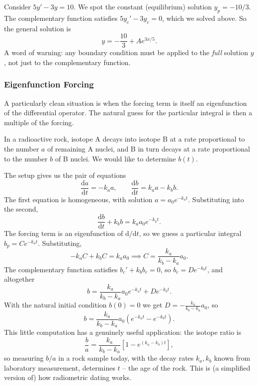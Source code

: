 \documentclass[a4paper]{scrartcl}
\begin{document}
\begin{example}
	Consider $5y' - 3y = 10$. We spot the constant (equilibrium) solution $y_p = -10/3$. The complementary function satisfies $5y_c' - 3y_c = 0$, which we solved above. So the general solution is
	$$
	y = -\frac{10}{3} + A e^{3x/5}.
	$$
	A word of warning: any boundary condition must be applied to the \emph{full} solution $y$, not just to the complementary function.
\end{example}

\subsubsection{Eigenfunction Forcing}

A particularly clean situation is when the forcing term is itself an eigenfunction of the differential operator. The natural guess for the particular integral is then a multiple of the forcing.

\begin{example}
	In a radioactive rock, isotope A decays into isotope B at a rate proportional to the number $a$ of remaining A nuclei, and B in turn decays at a rate proportional to the number $b$ of B nuclei. We would like to determine $b(t)$.

	The setup gives us the pair of equations
	$$
	\frac{\mathrm{d}a}{\mathrm{d}t} = -k_a a, \qquad \frac{\mathrm{d}b}{\mathrm{d}t} = k_a a - k_b b.
	$$
	The first equation is homogeneous, with solution $a = a_0 e^{-k_a t}$. Substituting into the second,
	$$
	\frac{\mathrm{d}b}{\mathrm{d}t} + k_b b = k_a a_0 e^{-k_a t}.
	$$
	The forcing term is an eigenfunction of $\mathrm{d}/\mathrm{d}t$, so we guess a particular integral $b_p = C e^{-k_a t}$. Substituting,
	$$
	-k_a C + k_b C = k_a a_0 \implies C = \frac{k_a}{k_b - k_a} a_0.
	$$
	The complementary function satisfies $b_c' + k_b b_c = 0$, so $b_c = D e^{-k_b t}$, and altogether
	$$
	b = \frac{k_a}{k_b - k_a} a_0 e^{-k_a t} + D e^{-k_b t}.
	$$
	With the natural initial condition $b(0) = 0$ we get $D = -\frac{k_a}{k_b - k_a}a_0$, so
	$$
	b = \frac{k_a}{k_b - k_a} a_0 \left(e^{-k_a t} - e^{-k_b t}\right).
	$$
	This little computation has a genuinely useful application: the isotope ratio is
	$$
	\frac{b}{a} = \frac{k_a}{k_b - k_a}\left[1 - e^{(k_a - k_b)t}\right],
	$$
	so measuring $b/a$ in a rock sample today, with the decay rates $k_a, k_b$ known from laboratory measurement, determines $t$ -- the age of the rock. This is (a simplified version of) how radiometric dating works.
\end{example}
\end{document}
